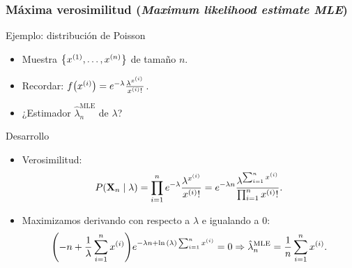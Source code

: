 \documentclass[table]{beamer}
\begin{document}
\begin{frame}
    \frametitle{Máxima verosimilitud (\emph{Maximum likelihood estimate MLE})}
    \begin{exampleblock}{Ejemplo: distribución de Poisson}
        \begin{itemize}
            \item Muestra $\bparens{x^{\parens{1}} , \ldots , x^{\parens{n}}}$ de tamaño $n$.
            \item Recordar: $\ff{x^{\parens{i}}} = e^{- \lambda} \frac{\lambda^{x^{\parens{i}}}}{x^{\parens{i}} !}$.
            \item ¿Estimador $\hat{\lambda}_{n}^{\text{MLE}}$ de $\lambda$?
        \end{itemize}
    \end{exampleblock}
    \begin{block}{Desarrollo}
        \begin{itemize}
            \item Verosimilitud:
                \begin{equation*}
                    \prob{\Xvec_{n} \mid \lambda} = \prod_{i = 1}^{n} e^{- \lambda} \frac{\lambda^{x^{\parens{i}}}}{x^{\parens{i}} !} = e^{- \lambda n} \frac{\lambda^{\sum_{i = 1}^{n} x^{\parens{i}}}}{\prod_{i = 1}^{n} x^{\parens{i}} !} .
                \end{equation*}
            \item Maximizamos derivando con respecto a $\lambda$ e igualando a $0$:
                \begin{equation*}
                    \parens{- n + \frac{1}{\lambda} \sum_{i = 1}^{n} x^{\parens{i}}} e^{- \lambda n + \ln{\parens{\lambda}} \sum_{i = 1}^{n} x^{\parens{i}}} = 0 \Rightarrow \hat{\lambda}_{n}^\text{MLE} = \frac{1}{n} \sum_{i = 1}^{n} x^{\parens{i}} .
                \end{equation*}
        \end{itemize}
    \end{block}
\end{frame}
\end{document}
